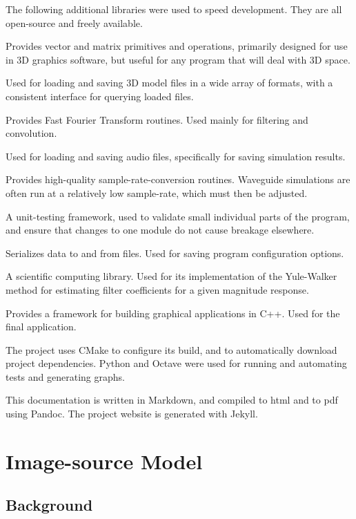 \documentclass[]{scrreprt}
\providecommand{\tightlist}{%
  \setlength{\itemsep}{0pt}\setlength{\parskip}{0pt}}
\begin{document}
The following additional libraries were used to speed development. They
are all open-source and freely available.

\begin{description}
\tightlist
\item[GLM]
Provides vector and matrix primitives and operations, primarily designed
for use in 3D graphics software, but useful for any program that will
deal with 3D space.
\item[Assimp]
Used for loading and saving 3D model files in a wide array of formats,
with a consistent interface for querying loaded files.
\item[FFTW3]
Provides Fast Fourier Transform routines. Used mainly for filtering and
convolution.
\item[Libsndfile]
Used for loading and saving audio files, specifically for saving
simulation results.
\item[Libsamplerate]
Provides high-quality sample-rate-conversion routines. Waveguide
simulations are often run at a relatively low sample-rate, which must
then be adjusted.
\item[Gtest]
A unit-testing framework, used to validate small individual parts of the
program, and ensure that changes to one module do not cause breakage
elsewhere.
\item[Cereal]
Serializes data to and from files. Used for saving program configuration
options.
\item[ITPP]
A scientific computing library. Used for its implementation of the
Yule-Walker method for estimating filter coefficients for a given
magnitude response.
\item[JUCE]
Provides a framework for building graphical applications in C++. Used
for the final application.
\end{description}

The project uses CMake to configure its build, and to automatically
download project dependencies. Python and Octave were used for running
and automating tests and generating graphs.

This documentation is written in Markdown, and compiled to html and to
pdf using Pandoc. The project website is generated with Jekyll.

\chapter{Image-source Model}\label{image-source-model}

\section{Background}\label{background}
\end{document}
